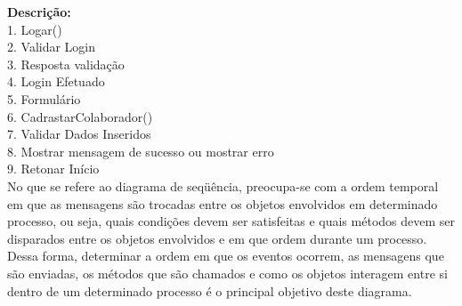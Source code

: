 \documentclass[a4paper]{article}
\begin{document}
    {\bf Descrição:}\\
    1. Logar()\\
    2. Validar Login\\
    3. Resposta validação\\
    4. Login Efetuado\\
    5. Formulário\\
    6. CadrastarColaborador()\\
    7. Validar Dados Inseridos\\
    8. Mostrar mensagem de sucesso ou mostrar erro\\
    9. Retonar Início\\
    
    
    No que se refere ao diagrama de seqüência, preocupa-se com a ordem temporal
    em que as mensagens são trocadas entre os objetos envolvidos em determinado
    processo, ou seja, quais condições devem ser satisfeitas e quais métodos devem
    ser disparados entre os objetos envolvidos e em que ordem durante um processo.
    Dessa forma, determinar a ordem em que os eventos ocorrem, as mensagens que são
    enviadas, os métodos que são chamados e como os objetos interagem entre si dentro
    de um determinado processo é o principal objetivo deste diagrama.
    
\end{document}
